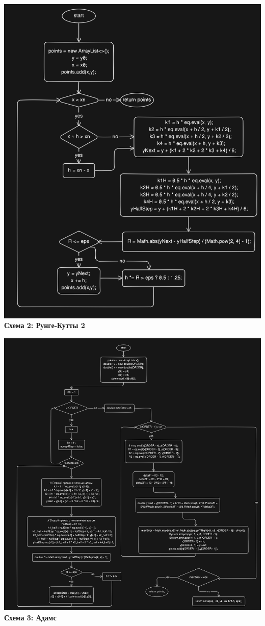\documentclass{article}
\begin{document}
\begin{center}
    \includegraphics[width=.9\textwidth]{rungeS.png}\\
    \textbf{Схема 2: Рунге-Кутты 2}
\end{center}
\begin{center}
    \includegraphics[width=.9\textwidth]{adams.png}\\
    \textbf{Схема 3: Адамс}
\end{center}
\end{document}
